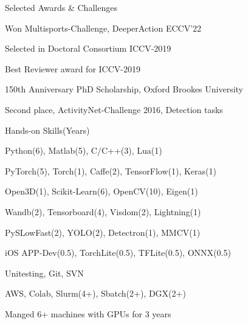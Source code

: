 \documentclass{resume} %
\begin{document}
\begin{multicols}{2}
\begin{mSection}{Selected Awards \& Challenges}{}
\begin{sSubsection}{Won Multisports-Challenge, DeeperAction ECCV'22}\end{sSubsection} %
\begin{sSubsection}{Selected in Doctoral Consortium ICCV-2019}\end{sSubsection}  %
\begin{sSubsection}{Best Reviewer award for ICCV-2019}\end{sSubsection} %
\begin{sSubsection}{150th Anniversary PhD Scholarship, Oxford Brookes University}\end{sSubsection} %
\begin{sSubsection}{Second place, ActivityNet-Challenge 2016, Detection tasks}\end{sSubsection} %
\end{mSection}

\begin{mSection}{Hands-on Skills}{(Years)} 
  \begin{sSubsection}{Python(6), Matlab(5), C/C++(3), Lua(1)}\end{sSubsection}
  \begin{sSubsection}{PyTorch(5), Torch(1), Caffe(2), TensorFlow(1), Keras(1)}\end{sSubsection}
  \begin{sSubsection}{Open3D(1), Scikit-Learn(6), OpenCV(10), Eigen(1)}\end{sSubsection}
  \begin{sSubsection}{Wandb(2), Tensorboard(4), Visdom(2), Lightning(1)}\end{sSubsection}
  \begin{sSubsection}{PySLowFast(2), YOLO(2), Detectron(1), MMCV(1)}\end{sSubsection}
  \begin{sSubsection}{iOS APP-Dev(0.5), TorchLite(0.5), TFLite(0.5), ONNX(0.5)}\end{sSubsection}
  \begin{sSubsection}{ Unitesting, Git, SVN}\end{sSubsection} %
  \begin{sSubsection}{AWS, Colab, Slurm(4+), Sbatch(2+), DGX(2+)}\end{sSubsection}
  \begin{sSubsection}{Manged 6+ machines with GPUs for 3 years }\end{sSubsection}
\end{mSection}


\end{multicols}
\end{document}
